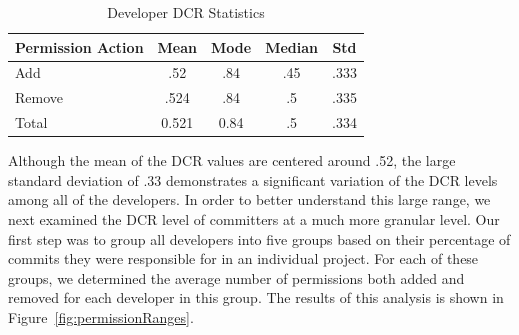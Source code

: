 \documentclass{sig-alternate-05-2015}
\begin{document}
\begin{table}[h]
\begin{center}
\caption{Developer DCR Statistics}
\label{Table:percentageCommitPermssion}
 \begin{tabular}{ | l | c | c | c | c | } \hline

  \bfseries Permission Action & \bfseries Mean & \bfseries Mode & \bfseries Median & \bfseries Std  \\ \hline

    Add & .52 & .84 & .45 & .333 \\ \hline
    Remove & .524 & .84 & .5 & .335 \\ \hline \hline
    Total & 0.521 & 0.84 & .5 & .334 \\ \hline
	
  \end{tabular}
  \end{center}
\end{table}


%
%
%





Although the mean of the DCR values are centered around .52, the large standard deviation of .33 demonstrates a significant variation of the DCR levels among all of the developers. In order to better understand this large range, we next examined the DCR level of committers at a much more granular level. Our first step was to group all developers into five groups based on their percentage of commits they were responsible for in an individual project. For each of these groups, we determined the average number of permissions both added and removed  for each developer in this group. The results of this analysis is shown in Figure~\ref{fig:permissionRanges}.




\end{document}
